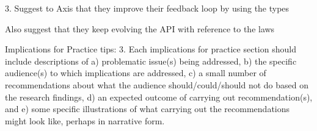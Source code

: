 \documentclass{sig-alternate}
\begin{document}





3. Suggest to Axis that they improve their feedback loop by using the types

Also suggest that they keep evolving the API with reference to the laws



Implications for Practice tips: 
       3. Each implications for practice section should include descriptions of 
       a) problematic issue(s) being addressed, 
       b) the specific audience(s) to which implications are addressed, 
       c) a small number of recommendations about what the audience should/could/should not do based on the research findings, 
       d) an expected outcome of carrying out recommendation(s), and 
       e) some specific illustrations of what carrying out the recommendations might look like, perhaps in narrative form.
\end{document}

